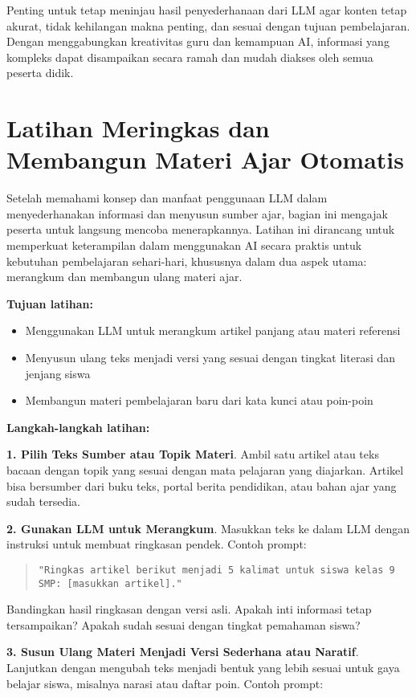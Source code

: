 Penting untuk tetap meninjau hasil penyederhanaan dari LLM agar konten tetap akurat, tidak kehilangan makna penting, dan sesuai dengan tujuan pembelajaran. Dengan menggabungkan kreativitas guru dan kemampuan AI, informasi yang kompleks dapat disampaikan secara ramah dan mudah diakses oleh semua peserta didik.

\section{Latihan Meringkas dan Membangun Materi Ajar Otomatis}

Setelah memahami konsep dan manfaat penggunaan LLM dalam menyederhanakan informasi dan menyusun sumber ajar, bagian ini mengajak peserta untuk langsung mencoba menerapkannya. Latihan ini dirancang untuk memperkuat keterampilan dalam menggunakan AI secara praktis untuk kebutuhan pembelajaran sehari-hari, khususnya dalam dua aspek utama: merangkum dan membangun ulang materi ajar.

\textbf{Tujuan latihan:}
\begin{itemize}
	\item Menggunakan LLM untuk merangkum artikel panjang atau materi referensi
	\item Menyusun ulang teks menjadi versi yang sesuai dengan tingkat literasi dan jenjang siswa
	\item Membangun materi pembelajaran baru dari kata kunci atau poin-poin
\end{itemize}

\textbf{Langkah-langkah latihan:}

\textbf{1. Pilih Teks Sumber atau Topik Materi}.  
Ambil satu artikel atau teks bacaan dengan topik yang sesuai dengan mata pelajaran yang diajarkan. Artikel bisa bersumber dari buku teks, portal berita pendidikan, atau bahan ajar yang sudah tersedia.

\textbf{2. Gunakan LLM untuk Merangkum}.  
Masukkan teks ke dalam LLM dengan instruksi untuk membuat ringkasan pendek. Contoh prompt:

\begin{quote}
	\centering
	\texttt{"Ringkas artikel berikut menjadi 5 kalimat untuk siswa kelas 9 SMP: [masukkan artikel]."}
\end{quote}

Bandingkan hasil ringkasan dengan versi asli. Apakah inti informasi tetap tersampaikan? Apakah sudah sesuai dengan tingkat pemahaman siswa?

\textbf{3. Susun Ulang Materi Menjadi Versi Sederhana atau Naratif}.  
Lanjutkan dengan mengubah teks menjadi bentuk yang lebih sesuai untuk gaya belajar siswa, misalnya narasi atau daftar poin. Contoh prompt:

